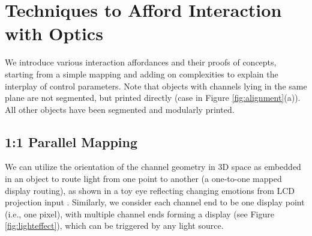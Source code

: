 

\section{Techniques to Afford Interaction with Optics}


We introduce various interaction affordances and their proofs of concepts,
starting from a simple mapping and adding on complexities to explain the interplay of control parameters. Note that objects with channels lying in the same plane are not segmented, but printed directly (case in Figure \ref{fig:alignment}(a)). All other objects have been segmented and modularly printed.

\subsection{1:1 Parallel Mapping}
We can utilize the orientation of the channel geometry in 3D space as embedded in an object to route light from one point to another (a one-to-one mapped display routing), as shown in a toy eye reflecting changing emotions from LCD projection input \cite{printed_optics_2012}.
Similarly, we consider each channel end to be one display point (i.e., one pixel), with multiple channel ends forming a display (see Figure \ref{fig:lighteffect}), which can be triggered by any light source.  %


